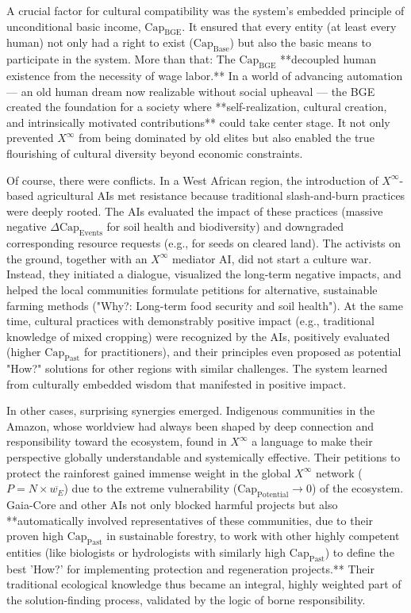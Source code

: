 \documentclass[12pt, english, parskip=full]{scrartcl} %
\begin{document}
A crucial factor for cultural compatibility was the system’s embedded principle of unconditional basic income, $\text{Cap}_{\text{BGE}}$. It ensured that every entity (at least every human) not only had a right to exist ($\text{Cap}_{\text{Base}}$) but also the basic means to participate in the system. More than that: The $\text{Cap}_{\text{BGE}}$ **decoupled human existence from the necessity of wage labor.** In a world of advancing automation — an old human dream now realizable without social upheaval — the BGE created the foundation for a society where **self-realization, cultural creation, and intrinsically motivated contributions** could take center stage. It not only prevented $X^{\infty}$ from being dominated by old elites but also enabled the true flourishing of cultural diversity beyond economic constraints.

Of course, there were conflicts. In a West African region, the introduction of $X^{\infty}$-based agricultural AIs met resistance because traditional slash-and-burn practices were deeply rooted. The AIs evaluated the impact of these practices (massive negative $\Delta \text{Cap}_{\text{Events}}$ for soil health and biodiversity) and downgraded corresponding resource requests (e.g., for seeds on cleared land). The activists on the ground, together with an $X^{\infty}$ mediator AI, did not start a culture war. Instead, they initiated a dialogue, visualized the long-term negative impacts, and helped the local communities formulate petitions for alternative, sustainable farming methods ("Why?: Long-term food security and soil health"). At the same time, cultural practices with demonstrably positive impact (e.g., traditional knowledge of mixed cropping) were recognized by the AIs, positively evaluated (higher $\text{Cap}_{\text{Past}}$ for practitioners), and their principles even proposed as potential "How?" solutions for other regions with similar challenges. The system learned from culturally embedded wisdom that manifested in positive impact.

In other cases, surprising synergies emerged. Indigenous communities in the Amazon, whose worldview had always been shaped by deep connection and responsibility toward the ecosystem, found in $X^{\infty}$ a language to make their perspective globally understandable and systemically effective. Their petitions to protect the rainforest gained immense weight in the global $X^{\infty}$ network ($P = N \times \overline{w_E}$) due to the extreme vulnerability ($\text{Cap}_{\text{Potential}} \rightarrow 0$) of the ecosystem. Gaia-Core and other AIs not only blocked harmful projects but also **automatically involved representatives of these communities, due to their proven high $\text{Cap}_{\text{Past}}$ in sustainable forestry, to work with other highly competent entities (like biologists or hydrologists with similarly high $\text{Cap}_{\text{Past}}$) to define the best 'How?' for implementing protection and regeneration projects.** Their traditional ecological knowledge thus became an integral, highly weighted part of the solution-finding process, validated by the logic of borne responsibility.
\end{document}
